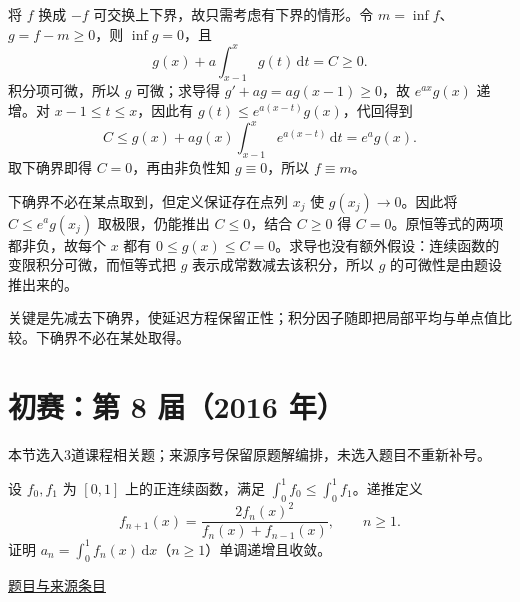 \documentclass[UTF8,12pt,a4paper,fontset=fandol]{ctexart}
\begin{document}
\begin{solve}\label{ans:pre07-math:6}

将 $f$ 换成 $-f$ 可交换上下界，故只需考虑有下界的情形。令 $m=\inf f$、$g=f-m\ge0$，则 $\inf g=0$，且
\[
g(x)+a\int_{x-1}^xg(t)\,\mathrm dt=C\ge0.
\]
积分项可微，所以 $g$ 可微；求导得 $g'+ag=ag(x-1)\ge0$，故 $e^{ax}g(x)$ 递增。对 $x-1\le t\le x$，因此有 $g(t)\le e^{a(x-t)}g(x)$，代回得到
\[
C\le g(x)+ag(x)\int_{x-1}^xe^{a(x-t)}\,\mathrm dt=e^ag(x).
\]
取下确界即得 $C=0$，再由非负性知 $g\equiv0$，所以 $f\equiv m$。

下确界不必在某点取到，但定义保证存在点列 $x_j$ 使 $g(x_j)\to0$。因此将 $C\le e^ag(x_j)$ 取极限，仍能推出 $C\le0$，结合 $C\ge0$ 得 $C=0$。原恒等式的两项都非负，故每个 $x$ 都有 $0\le g(x)\le C=0$。求导也没有额外假设：连续函数的变限积分可微，而恒等式把 $g$ 表示成常数减去该积分，所以 $g$ 的可微性是由题设推出来的。

\end{solve}

\begin{remark}[方法与条件]关键是先减去下确界，使延迟方程保留正性；积分因子随即把局部平均与单点值比较。下确界不必在某处取得。\end{remark}

\section{初赛：第 8 届（2016 年）}

本节选入3道课程相关题；来源序号保留原题解编排，未选入题目不重新补号。

\begin{example}[来源序号4]\label{ex:pre08-math:4}\label{pr:pre08-math:4}

设 $f_0,f_1$ 为 $[0,1]$ 上的正连续函数，满足 $\int_0^1f_0\le\int_0^1f_1$。递推定义
\[
f_{n+1}(x)=\frac{2f_n(x)^2}{f_n(x)+f_{n-1}(x)},\qquad n\ge1.
\]
证明 $a_n=\int_0^1f_n(x)\,\mathrm dx$（$n\ge1$）单调递增且收敛。

\par\href{https://github.com/lzxcr/cmc-mathematics/blob/64916fa1fdbc3e444a652eca204d5669058ee321/src/problems/preliminary/08/04.md}{题目与来源条目}

\end{example}
\end{document}
